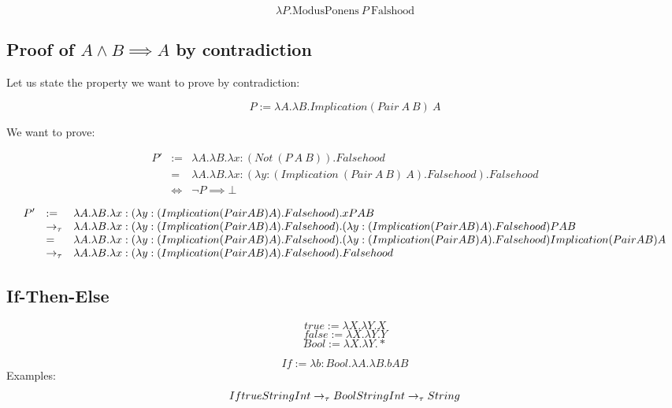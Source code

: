 \[
    \lambda P.\text{ModusPonens}\ P\ \text{Falshood}
\]

\subsection{Proof of $A \land B \implies A$ by contradiction}

Let us state the property we want to prove by contradiction:

\[
    P := \lambda A.\lambda B.Implication (Pair\ A\ B)\ A
\]

We want to prove:

\[
\begin{array}{lll}
    P'  & :=      & \lambda A.\lambda B.\lambda x:(Not\ (P\ A\ B)).Falsehood \\
        & =       & \lambda A.\lambda B.\lambda x:(\lambda y:(Implication\ (Pair\ A\ B)\ A).Falsehood).Falsehood \\
        & \Leftrightarrow       & \neg P \implies \bot
\end{array}
\]

\[
\begin{array}{lll}
    P'  & :=      & \lambda A.\lambda B.\lambda x:(\lambda y:(Implication (Pair A B) A).Falsehood).x P A B \\
        & \to_\tau  & \lambda A.\lambda B.\lambda x:(\lambda y:(Implication (Pair A B) A).Falsehood).(\lambda y:(Implication (Pair A B) A).Falsehood) P A B \\
        & =       & \lambda A.\lambda B.\lambda x:(\lambda y:(Implication (Pair A B) A).Falsehood).(\lambda y:(Implication (Pair A B) A).Falsehood) Implication (Pair A B) A \\
        & \to_\tau  & \lambda A.\lambda B.\lambda x:(\lambda y:(Implication (Pair A B) A).Falsehood).Falsehood
\end{array}
\]



\subsection{If-Then-Else}

\[
    true := \lambda X.\lambda Y.X
\]
\[
    false := \lambda X.\lambda Y.Y
\]
\[
    Bool := \lambda X.\lambda Y.*
\]

\[
    If := \lambda b: Bool.\lambda A.\lambda B.b A B
\]
Examples:
\[
    If true String Int \to_\tau Bool String Int \to_\tau String
\]



